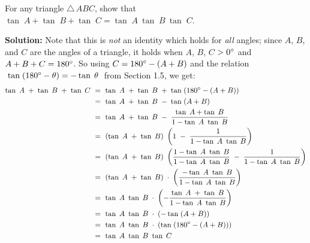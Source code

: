 \begin{exmp}\label{exmp:sumtantriangle}
 For any triangle $\triangle\,ABC$, show that $\tan\;A + \tan\;B + \tan\;C =
 \tan\;A~\tan\;B~\tan\;C$.\vspace{1mm}
 \par\noindent\textbf{Solution:} Note that this is \emph{not} an identity which holds for \emph{all}
 angles; since $A$, $B$, and $C$ are the angles of a triangle, it holds when $A$, $B$, $C$
 $> 0^\circ$ and $A + B + C = 180^\circ$. So using $C = 180^\circ - (A+B)$ and the relation
 $\;\tan\;(180^\circ - \theta) = -\tan\;\theta\;$ from Section 1.5, we get:
 \begin{align*}
  \tan\;A \;+\; \tan\;B \;+\; \tan\;C ~&=~ \tan\;A \;+\; \tan\;B \;+\; \tan\;(180^\circ - (A+B))\\
  &=~ \tan\;A \;+\; \tan\;B \;-\; \tan\;(A+B)\\
  &=~ \tan\;A \;+\; \tan\;B \;-\; \frac{\tan\;A + \tan\;B}{1 - \tan\;A ~ \tan\;B}\\
  &=~ (\tan\;A \;+\; \tan\;B)~\left( 1 \;-\; \dfrac{1}{1 - \tan\;A ~ \tan\;B} \right)\\
  &=~ (\tan\;A \;+\; \tan\;B)~\left( \dfrac{1 - \tan\;A ~ \tan\;B}{1 - \tan\;A ~ \tan\;B} \;-\;
   \dfrac{1}{1 - \tan\;A ~ \tan\;B} \right)\\
  &=~ (\tan\;A \;+\; \tan\;B)\;\cdot\;\left( \frac{-\tan\;A ~ \tan\;B}{{1 - \tan\;A ~ \tan\;B}}
   \right)\\
  &=~ \tan\;A ~ \tan\;B \;\cdot\; \left( -\frac{\tan\;A \;+\; \tan\;B}{{1 - \tan\;A ~ \tan\;B}}
   \right)\\
  &=~ \tan\;A ~ \tan\;B \;\cdot\; (-\tan\;(A+B))\\
  &=~ \tan\;A ~ \tan\;B \;\cdot\; (\tan\;(180^\circ - (A+B)))\\
  &=~ \tan\;A ~ \tan\;B ~ \tan\;C
 \end{align*}
\end{exmp}\vspace{-5mm}
